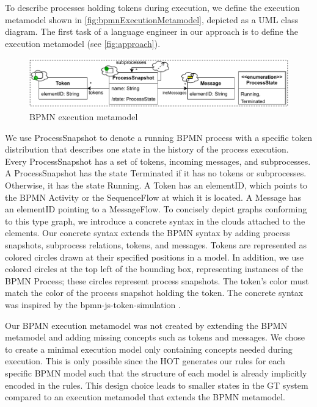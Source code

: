 \documentclass{lmcs} %
\begin{document}
To describe processes holding tokens during execution, we define the execution metamodel shown in \autoref{fig:bpmnExecutionMetamodel}, depicted as a UML class diagram.
The first task of a language engineer in our approach is to define the execution metamodel (see \autoref{fig:approach}).

\begin{figure}[ht]
  \centering
  \includegraphics[width=1\linewidth]{images/bpmn_semantics-typegraph.pdf}
  \caption{BPMN execution metamodel}
  \label{fig:bpmnExecutionMetamodel}
\end{figure}

We use \textsf{ProcessSnapshot} to denote a running BPMN process with a specific token distribution that describes one state in the history of the process execution.
Every \textsf{ProcessSnapshot} has a set of \textsf{tokens}, incoming \textsf{messages}, and \textsf{subprocesses}.
A \textsf{ProcessSnapshot} has the state \textsf{Terminated} if it has no \textsf{tokens} or \textsf{subprocesses}.
Otherwise, it has the state \textsf{Running}.
A \textsf{Token} has an \textsf{elementID}, which points to the BPMN \textsf{Activity} or the \textsf{SequenceFlow} at which it is located.
A \textsf{Message} has an \textsf{elementID} pointing to a \textsf{MessageFlow}.
To concisely depict graphs conforming to this type graph, we introduce a concrete syntax in the clouds attached to the elements.
Our concrete syntax extends the BPMN syntax by adding process snapshots, subprocess relations, tokens, and messages.
Tokens are represented as colored circles drawn at their specified positions in a model.
In addition, we use colored circles at the top left of the bounding box, representing instances of the BPMN \textsf{Process}; these circles represent process snapshots.
The token's color must match the color of the process snapshot holding the token.
The concrete syntax was inspired by the bpmn-js-token-simulation \cite{camundaservicesgmbhBpmnjsTokenSimulation2023}.

Our BPMN execution metamodel was not created by extending the BPMN metamodel and adding missing concepts such as tokens and messages.
We chose to create a minimal execution model only containing concepts needed during execution.
This is only possible since the HOT generates our rules for each specific BPMN model such that the structure of each model is already implicitly encoded in the rules.
This design choice leads to smaller states in the GT system compared to an execution metamodel that extends the BPMN metamodel.
\end{document}
